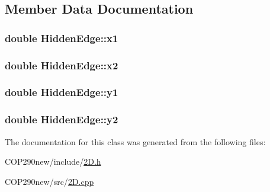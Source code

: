 \subsection{Member Data Documentation}
\subsubsection[{\texorpdfstring{x1}{x1}}]{\setlength{\rightskip}{0pt plus 5cm}double Hidden\+Edge\+::x1}\hypertarget{class_hidden_edge_a88852bec50f731eb4a99f4dd4ae0e164}{}\label{class_hidden_edge_a88852bec50f731eb4a99f4dd4ae0e164}
\subsubsection[{\texorpdfstring{x2}{x2}}]{\setlength{\rightskip}{0pt plus 5cm}double Hidden\+Edge\+::x2}\hypertarget{class_hidden_edge_a9aff2c4454c68646539f7acdb3f4b03d}{}\label{class_hidden_edge_a9aff2c4454c68646539f7acdb3f4b03d}
\subsubsection[{\texorpdfstring{y1}{y1}}]{\setlength{\rightskip}{0pt plus 5cm}double Hidden\+Edge\+::y1}\hypertarget{class_hidden_edge_a87287402da645b02942d3756f3b19d17}{}\label{class_hidden_edge_a87287402da645b02942d3756f3b19d17}
\subsubsection[{\texorpdfstring{y2}{y2}}]{\setlength{\rightskip}{0pt plus 5cm}double Hidden\+Edge\+::y2}\hypertarget{class_hidden_edge_ac9a5f3aaf4141bf25ed794ae1b7e5a1c}{}\label{class_hidden_edge_ac9a5f3aaf4141bf25ed794ae1b7e5a1c}


The documentation for this class was generated from the following files\+:\begin{DoxyCompactItemize}
\item 
C\+O\+P290new/include/\hyperlink{2_d_8h}{2\+D.\+h}\item 
C\+O\+P290new/src/\hyperlink{2_d_8cpp}{2\+D.\+cpp}\end{DoxyCompactItemize}
